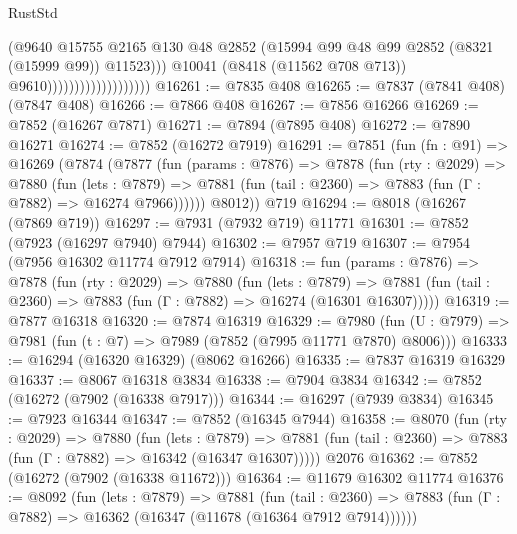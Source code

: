\begin{lexlean}{RustStd}
\begin{coremodule}
                                            (@9640
                                              @15755
                                              @2165
                                              @130
                                              @48
                                              @2852
                                              (@15994
                                                @99
                                                @48
                                                @99
                                                @2852
                                                (@8321 (@15999 @99))
                                                @11523)))
                                          @10041
                                          (@8418 (@11562 @708 @713))
                                          @9610)))))))))))))))))))
@16261 := @7835 @408
@16265 := @7837 (@7841 @408) (@7847 @408)
@16266 := @7866 @408
@16267 := @7856 @16266
@16269 := @7852 (@16267 @7871)
@16271 := @7894 (@7895 @408)
@16272 := @7890 @16271
@16274 := @7852 (@16272 @7919)
@16291 := @7851
    (fun (fn : @91) =>
    @16269
      (@7874
        (@7877
          (fun (params : @7876) =>
          @7878
            (fun (rty : @2029) =>
            @7880
              (fun (lets : @7879) =>
              @7881 (fun (tail : @2360) => @7883 (fun (Γ : @7882) => @16274 @7966))))))
        @8012))
    @719
@16294 := @8018 (@16267 (@7869 @719))
@16297 := @7931 (@7932 @719) @11771
@16301 := @7852 (@7923 (@16297 @7940) @7944)
@16302 := @7957 @719
@16307 := @7954 (@7956 @16302 @11774 @7912 @7914)
@16318 := fun (params : @7876) =>
  @7878
    (fun (rty : @2029) =>
    @7880
      (fun (lets : @7879) =>
      @7881 (fun (tail : @2360) => @7883 (fun (Γ : @7882) => @16274 (@16301 @16307)))))
@16319 := @7877 @16318
@16320 := @7874 @16319
@16329 := @7980
    (fun (U : @7979) => @7981 (fun (t : @7) => @7989 (@7852 (@7995 @11771 @7870) @8006)))
@16333 := @16294 (@16320 @16329) (@8062 @16266)
@16335 := @7837 @16319 @16329
@16337 := @8067 @16318 @3834
@16338 := @7904 @3834
@16342 := @7852 (@16272 (@7902 (@16338 @7917)))
@16344 := @16297 (@7939 @3834)
@16345 := @7923 @16344
@16347 := @7852 (@16345 @7944)
@16358 := @8070
    (fun (rty : @2029) =>
    @7880
      (fun (lets : @7879) =>
      @7881 (fun (tail : @2360) => @7883 (fun (Γ : @7882) => @16342 (@16347 @16307)))))
    @2076
@16362 := @7852 (@16272 (@7902 (@16338 @11672)))
@16364 := @11679 @16302 @11774
@16376 := @8092
    (fun (lets : @7879) =>
    @7881
      (fun (tail : @2360) =>
      @7883 (fun (Γ : @7882) => @16362 (@16347 (@11678 (@16364 @7912 @7914))))))

\end{coremodule}
\end{lexlean}
